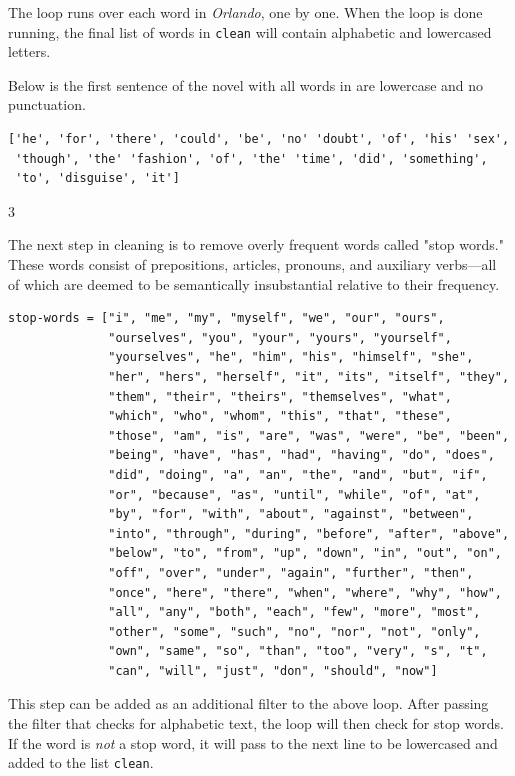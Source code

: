 \documentclass[11pt]{article}
\begin{document}
The loop runs over each word in \emph{Orlando}, one by one. When the loop
is done running, the final list of words in \texttt{clean} will contain
alphabetic and lowercased letters.

Below is the first sentence of the novel with all words in are
lowercase and no punctuation.


\begin{verbatim}
['he', 'for', 'there', 'could', 'be', 'no' 'doubt', 'of', 'his' 'sex',
 'though', 'the' 'fashion', 'of', 'the' 'time', 'did', 'something',
 'to', 'disguise', 'it']
\end{verbatim}



3

The next step in cleaning is to remove overly frequent words called
"stop words." These words consist of prepositions, articles, pronouns,
and auxiliary verbs---all of which are deemed to be semantically
insubstantial relative to their frequency.

\begin{verbatim}
stop-words = ["i", "me", "my", "myself", "we", "our", "ours",
              "ourselves", "you", "your", "yours", "yourself",
              "yourselves", "he", "him", "his", "himself", "she",
              "her", "hers", "herself", "it", "its", "itself", "they",
              "them", "their", "theirs", "themselves", "what",
              "which", "who", "whom", "this", "that", "these",
              "those", "am", "is", "are", "was", "were", "be", "been",
              "being", "have", "has", "had", "having", "do", "does",
              "did", "doing", "a", "an", "the", "and", "but", "if",
              "or", "because", "as", "until", "while", "of", "at",
              "by", "for", "with", "about", "against", "between",
              "into", "through", "during", "before", "after", "above",
              "below", "to", "from", "up", "down", "in", "out", "on",
              "off", "over", "under", "again", "further", "then",
              "once", "here", "there", "when", "where", "why", "how",
              "all", "any", "both", "each", "few", "more", "most",
              "other", "some", "such", "no", "nor", "not", "only",
              "own", "same", "so", "than", "too", "very", "s", "t",
              "can", "will", "just", "don", "should", "now"]

\end{verbatim}

This step can be added as an additional filter to the above loop.
After passing the filter that checks for alphabetic text, the loop
will then check for stop words. If the word is \emph{not} a stop word, it
will pass to the next line to be lowercased and added to the list
\texttt{clean}.
\end{document}

